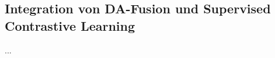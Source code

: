 
\subsection{Integration von DA-Fusion und Supervised Contrastive Learning} \label{sec:da-fusion-supcon}

...




